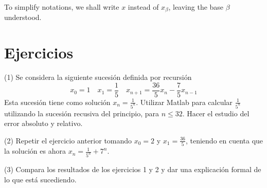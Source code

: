 To simplify notations, we shall write $x$ instead of $x_\beta$, leaving the base $\beta$ understood.

\section{Ejercicios}
(1) Se considera la siguiente sucesión definida por recursión
\[x_0 = 1 \quad x_1 = \frac{1}{5} \quad x_{n+1} = \frac{36}{5} x_n - \frac{7}{5} x_{n-1}\]
Esta sucesión tiene como solución $x_n = \frac{1}{5^n}$. Utilizar Matlab para calcular $\frac{1}{5^n}$ utilizando la sucesión recusiva del principio, para $n \leq 32$. Hacer el estudio del error absoluto y  relativo.

(2) Repetir el ejercicio anterior tomando $x_0 = 2$ y $x_1 = \frac{36}{5}$, teniendo en cuenta que la solución es ahora $x_n = \frac{1}{5^n} + 7^n$.

(3) Compara los resultados de los ejercicios 1 y 2 y dar una explicación formal de lo que está sucediendo.